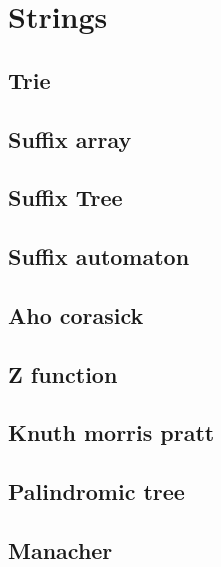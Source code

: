 
\section{Strings}
\subsection{Trie}
\subsection{Suffix array}
\subsection{Suffix Tree}
\subsection{Suffix automaton}
\subsection{Aho corasick}
\subsection{Z function}
\subsection{Knuth morris pratt}
\subsection{Palindromic tree}
\subsection{Manacher}

